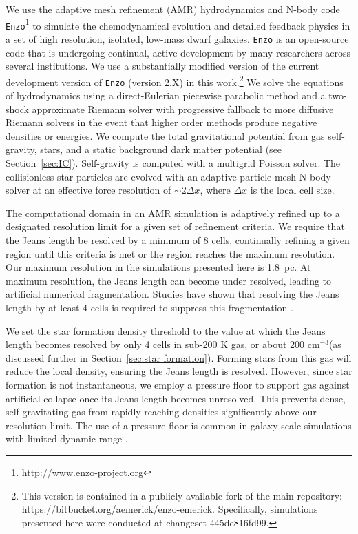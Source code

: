 \documentclass[twocolumn]{aastex61}
\newcommand{\ccunit}{cm$^{-3}$}
\begin{document}
We use the adaptive mesh refinement (AMR) hydrodynamics and N-body code \texttt{Enzo}\footnote{http://www.enzo-project.org} to simulate the chemodynamical evolution and detailed feedback physics in a set of high resolution, isolated, low-mass dwarf galaxies. \texttt{Enzo} is an open-source code that is undergoing continual, active development by many researchers across several institutions. We use a substantially modified version of the current development version of \texttt{Enzo} (version 2.X) in this work.\footnote{This version is contained in a publicly available fork of the main repository: https://bitbucket.org/aemerick/enzo-emerick. Specifically, simulations presented here were conducted at changeset 445de816fd99.} We solve the equations of hydrodynamics using a direct-Eulerian piecewise parabolic method \citep{ColellaWoodward1984, Bryan1995} and a two-shock approximate Riemann solver with progressive fallback to more diffusive Riemann solvers in the event that higher order methods produce negative densities or energies. We compute the total gravitational potential from gas self-gravity, stars, and a static background dark matter potential (see Section~\ref{sec:IC}). Self-gravity is computed with a multigrid Poisson solver. The collisionless star particles are evolved with an adaptive particle-mesh N-body solver at an effective force resolution of $\sim 2 \Delta x$, where $\Delta x$ is the local cell size. 

The computational domain in an AMR simulation is adaptively refined up to a designated resolution limit for a given set of refinement criteria. We require that the Jeans length be resolved by a minimum of 8 cells, continually refining a given region until this criteria is met or the region reaches the maximum resolution. Our maximum resolution in the simulations presented here is 1.8~pc. At maximum resolution, the Jeans length can become under resolved, leading to artificial numerical fragmentation. Studies have shown that resolving the Jeans length by at least 4 cells is required to suppress this fragmentation \citep{Truelove1997}.

We set the star formation density threshold to the value at which the Jeans length becomes resolved by only 4 cells in sub-200 K gas, or about 200 \ccunit (as discussed further in Section~\ref{sec:star formation}). Forming stars from this gas will reduce the local density, ensuring the Jeans length is resolved. However, since star formation is not instantaneous, we employ a pressure floor to support gas against artificial collapse once its Jeans length becomes unresolved. This prevents dense, self-gravitating gas from rapidly reaching densities significantly above our resolution limit. The use of a pressure floor is common in galaxy scale simulations with limited dynamic range \citep[e.g][]{Machacek2001,RobertsonKravtsov2008}.
\end{document}
